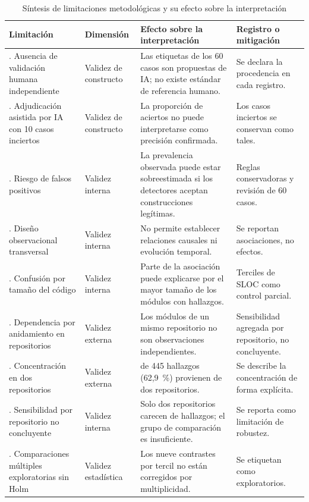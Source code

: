 \begin{table}[t]
\centering
\scriptsize
\setlength{\tabcolsep}{4pt}
\caption{Síntesis de limitaciones metodológicas y su efecto sobre la interpretación}
\label{tab:limitaciones}
\begin{tabularx}{\textwidth}{@{} >{\raggedright\arraybackslash}p{3.6cm} >{\raggedright\arraybackslash}p{2.3cm} >{\raggedright\arraybackslash}X >{\raggedright\arraybackslash}p{3.8cm} @{}}
\toprule
\textbf{Limitación} & \textbf{Dimensión} & \textbf{Efecto sobre la interpretación} & \textbf{Registro o mitigación} \\
\midrule
1. Ausencia de validación humana independiente & Validez de constructo & Las etiquetas de los 60 casos son propuestas de IA; no existe estándar de referencia humano. & Se declara la procedencia en cada registro. \\
2. Adjudicación asistida por IA con 10 casos inciertos & Validez de constructo & La proporción de aciertos no puede interpretarse como precisión confirmada. & Los casos inciertos se conservan como tales. \\
3. Riesgo de falsos positivos & Validez interna & La prevalencia observada puede estar sobreestimada si los detectores aceptan construcciones legítimas. & Reglas conservadoras y revisión de 60 casos. \\
4. Diseño observacional transversal & Validez interna & No permite establecer relaciones causales ni evolución temporal. & Se reportan asociaciones, no efectos. \\
5. Confusión por tamaño del código & Validez interna & Parte de la asociación puede explicarse por el mayor tamaño de los módulos con hallazgos. & Terciles de SLOC como control parcial. \\
6. Dependencia por anidamiento en repositorios & Validez externa & Los módulos de un mismo repositorio no son observaciones independientes. & Sensibilidad agregada por repositorio, no concluyente. \\
7. Concentración en dos repositorios & Validez externa & 280 de 445 hallazgos (62,9~\%) provienen de dos repositorios. & Se describe la concentración de forma explícita. \\
8. Sensibilidad por repositorio no concluyente & Validez interna & Solo dos repositorios carecen de hallazgos; el grupo de comparación es insuficiente. & Se reporta como limitación de robustez. \\
9. Comparaciones múltiples exploratorias sin Holm & Validez estadística & Los nueve contrastes por tercil no están corregidos por multiplicidad. & Se etiquetan como exploratorios. \\

\end{tabularx}
\end{table}
